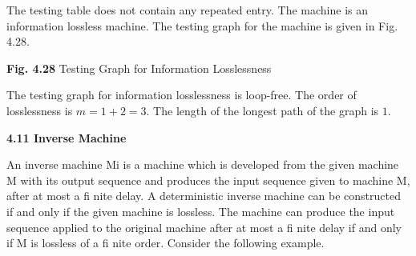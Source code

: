 \documentclass[a4]{article}
\begin{document}
The testing table does not contain any repeated entry. The machine is an information lossless machine.
The testing graph for the machine is given in Fig. 4.28.



\begin{center}
\end{center}

\centerline{\textbf{Fig. 4.28}\hspace*{0.1cm} Testing Graph for Information Losslessness}
\vspace*{0.1cm}

The testing graph for information losslessness is loop-free. The order of losslessness is $m = 1 + 2 = 3$. The length of the longest path of the graph is $1$.
\vspace*{0.1cm}

\LARGE{\textbf{4.11 \hspace*{0.1cm} Inverse Machine}}
\vspace*{0.1cm}

\small{An inverse machine Mi is a machine which is developed from the given machine M with its output sequence and produces the input sequence given to machine M, after at most a fi nite delay.
A deterministic inverse machine can be constructed if and only if the given machine is lossless. The machine can produce the input sequence applied to the original machine after at most a fi nite delay if and only if M is lossless of a fi nite order. Consider the following example.}
\end{document}
